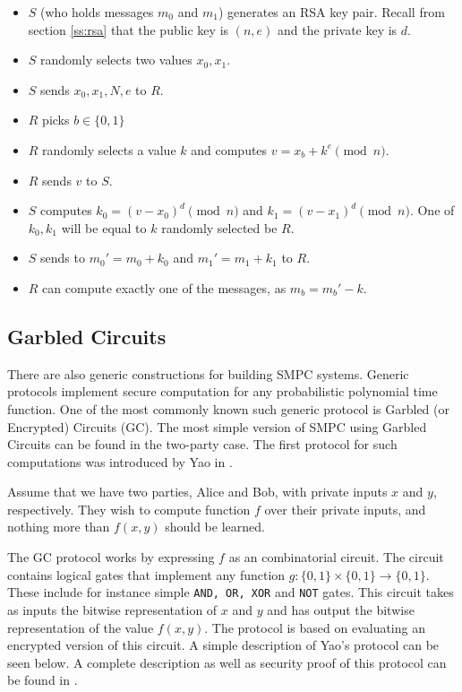 \begin{itemize}
  \item $S$ (who holds messages $m_0$ and $m_1$) generates an RSA key pair. Recall from section \ref{ss:rsa} that the public key is $(n,e)$ and the private key is $d$.
  \item $S$ randomly selects two values $x_0, x_1$.
  \item $S$ sends $x_0, x_1, N, e$ to $R$.
  \item $R$ picks $b \in \{0,1\}$
  \item $R$ randomly selects a value $k$ and computes $v = x_b + k^e \pmod{n}$.
  \item $R$ sends $v$ to $S$.
  \item $S$ computes $k_0 = (v-x_0)^d \pmod{n}$ and $k_1 = (v-x_1)^d \pmod{n}$. One of $k_0, k_1$ will be equal to $k$ randomly selected be $R$.
  \item $S$ sends to $m_0' = m_0 + k_0$ and $m_1' = m_1 + k_1$ to $R$.
  \item $R$ can compute exactly one of the messages, as $m_b = m_b' - k$.
\end{itemize}

\subsection{Garbled Circuits}\label{ss:garbled-circuits}
There are also generic constructions for building SMPC systems.
Generic protocols implement secure computation for any probabilistic polynomial time function.
One of the most commonly known such generic protocol is Garbled (or Encrypted) Circuits (GC).
The most simple version of SMPC using Garbled Circuits can be found in the two-party case.
The first protocol for such computations was introduced by Yao in \cite{yao1986generate}.

Assume that we have two parties, Alice and Bob, with private inputs $x$ and $y$, respectively.
They wish to compute function $f$ over their private inputs, and nothing more than $f(x,y)$ should be learned.

The GC protocol works by expressing $f$ as an combinatorial circuit.
The circuit contains logical gates that implement any function $g : \{0,1\} \times \{0,1\} \rightarrow \{0,1\}$.
These include for instance simple \texttt{AND, OR, XOR} and \texttt{NOT} gates.
This circuit takes as inputs the bitwise representation of $x$ and $y$ and has output the bitwise representation of the value $f(x,y)$.
The protocol is based on evaluating an encrypted version of this circuit.
A simple description of Yao's protocol can be seen below. A complete description as well as security proof of this protocol can be found in \cite{lindell2009proof}.

